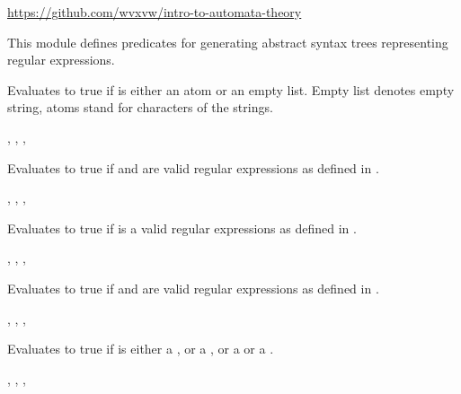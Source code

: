 \label{sec:ast}

\begin{tags}
\url{https://github.com/wvxvw/intro-to-automata-theory}
\end{tags}

This module defines predicates for generating abstract syntax trees
representing regular expressions.\vspace{0.7cm}

\begin{description}
Evaluates to true if  is either an atom or an empty list.
Empty list denotes empty string, atoms stand for characters of
the strings.

\begin{tags}
, , , 
\end{tags}

Evaluates to true if  and  are valid regular expressions
as defined in .

\begin{tags}
, , , 
\end{tags}

Evaluates to true if  is a valid regular expressions
as defined in .

\begin{tags}
, , , 
\end{tags}

Evaluates to true if  and  are valid regular expressions
as defined in .

\begin{tags}
, , , 
\end{tags}

Evaluates to true if  is either a , or a , or
a  or a .

\begin{tags}
, , , 
\end{tags}
\end{description}

